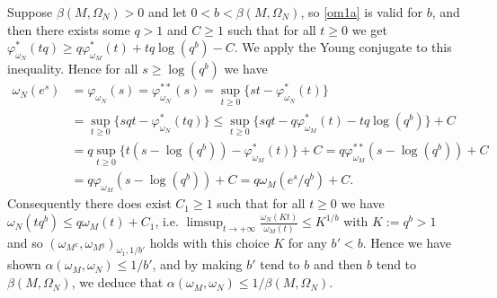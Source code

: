 \documentclass[10pt]{amsart}%
\numberwithin{equation}{section}
\theoremstyle{plain}
\begin{document}
Suppose $\beta(M,\Omega_N)>0$ and let $0<b<\beta(M,\Omega_N)$, so \eqref{om1a} is valid for $b$, and then there exists some $q>1$ and $C\ge 1$ such that for all $t\ge 0$ we get $\varphi^{*}_{\omega_{N}}(tq)\ge q\varphi^{*}_{\omega_{M}}(t)+tq\log(q^b)-C$. We apply the Young conjugate to this inequality. Hence for all $s\ge\log(q^b)$ we have
\begin{align*}
\omega_{N}(e^s)&=\varphi_{\omega_{N}}(s)=\varphi^{**}_{\omega_{N}}(s)=\sup_{t\ge 0}\{st-\varphi^{*}_{\omega_{N}}(t)\}
\\&
=\sup_{t\ge 0}\{sqt-\varphi^{*}_{\omega_{N}}(tq)\}\le\sup_{t\ge 0}\{sqt-q\varphi^{*}_{\omega_{M}}(t)-tq\log(q^b)\}+C
\\&
=q\sup_{t\ge 0}\{t(s-\log(q^b))-\varphi^{*}_{\omega_{M}}(t)\}+C=q\varphi^{**}_{\omega_{M}}(s-\log(q^b))+C
\\&
=q\varphi_{\omega_{M}}(s-\log(q^b))+C=q\omega_{M}(e^s/q^b)+C.
\end{align*}
Consequently there does exist $C_1\ge 1$ such that for all $t\ge 0$ we have $\omega_{N}(tq^b)\le q\omega_{M}(t)+C_1$, i.e.  $\limsup_{t\rightarrow+\infty}\frac{\omega_{N}(Kt)}{\omega_{M}(t)}\le K^{1/b}$ with $K:=q^b>1$ and so $(\omega_{M^x},\omega_{M^y})_{\omega_1,1/b'}$ holds with this choice $K$ for any $b'<b$.
Hence we have shown $\alpha(\omega_{M},\omega_{N})\le 1/b'$, and by making $b'$ tend to $b$ and then $b$ tend to $\beta(M,\Omega_N)$, we deduce that  $\alpha(\omega_{M},\omega_{N})\le 1/\beta(M,\Omega_N)$.\vspace{6pt}
\end{document}
